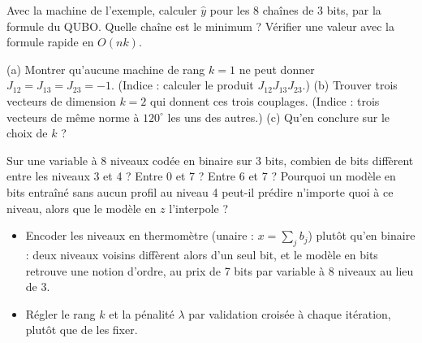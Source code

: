 \exercices
\begin{exercice}\label{ex:fm-main}
Avec la machine de l'exemple, calculer $\hat y$ pour les 8 chaînes de 3 bits, par la formule du QUBO. Quelle chaîne est le minimum ? Vérifier une valeur avec la formule rapide en $O(nk)$.
\end{exercice}
\begin{exercice}\label{ex:fm-rang}
(a) Montrer qu'aucune machine de rang $k=1$ ne peut donner $J_{12}=J_{13}=J_{23}=-1$. (Indice : calculer le produit $J_{12}J_{13}J_{23}$.) (b) Trouver trois vecteurs de dimension $k=2$ qui donnent ces trois couplages. (Indice : trois vecteurs de même norme à $120^\circ$ les uns des autres.) (c) Qu'en conclure sur le choix de $k$ ?
\end{exercice}
\begin{exercice}\label{ex:fm-ordre}
Sur une variable à 8 niveaux codée en binaire sur 3 bits, combien de bits diffèrent entre les niveaux 3 et 4 ? Entre 0 et 7 ? Entre 6 et 7 ? Pourquoi un modèle en bits entraîné sans aucun profil au niveau 4 peut-il prédire n'importe quoi à ce niveau, alors que le modèle en $z$ l'interpole ?
\end{exercice}

\begin{pistes}
\begin{itemize}
\item Encoder les niveaux en \og thermomètre\fg{} (unaire : $x=\sum_jb_j$) plutôt qu'en binaire : deux niveaux voisins diffèrent alors d'un seul bit, et le modèle en bits retrouve une notion d'ordre, au prix de 7 bits par variable à 8 niveaux au lieu de 3.
\item Régler le rang $k$ et la pénalité $\lambda$ par validation croisée à chaque itération, plutôt que de les fixer.
\end{itemize}
\end{pistes}
